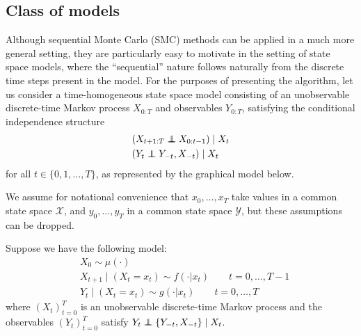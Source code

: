 \documentclass[fleqn]{article}
\newcommand\indep{\protect\mathpalette{\protect\independenT}{\perp}}
\def\independenT#1#2{\mathrel{\rlap{$#1#2$}\mkern2mu{#1#2}}}
\begin{document}
\subsection{Class of models}
Although sequential Monte Carlo (SMC) methods can be applied in a much more general setting, they are particularly easy to motivate in the setting of state space models, where the ``sequential'' nature follows naturally from the discrete time steps present in the model. 
For the purposes of presenting the algorithm, let us consider a time-homogeneous state space model consisting of an unobservable discrete-time Markov process $X_{0:T}$ and observables $Y_{0:T}$, satisfying the conditional independence structure
\begin{align*}
& (X_{t+1:T} \indep X_{0:t-1}) \mid X_t \\
& (Y_t \indep Y_{-t}, X_{-t}) \mid X_t
\end{align*}
for all $t \in \{0,1,\dots, T\}$, as represented by the graphical model below.

\begin{center}
\end{center}

We assume for notational convenience that $x_0,\dots,x_T$ take values in a common state space $\mathcal{X}$, and $y_0,\dots,y_T$ in a common state space $\mathcal{Y}$, but these assumptions can be dropped. 

Suppose we have the following model:
\begin{align*}
& X_0 \sim \mu(\cdot) \\
& X_{t+1} \mid (X_t = x_t) \sim f(\cdot | x_t)  \qquad t=0,\dots,T-1 \\
& Y_t \mid (X_t = x_t) \sim g(\cdot | x_t) \qquad t=0,\dots,T
\end{align*}
where $(X_t)_{t=0}^T$ is an unobservable discrete-time Markov process and the observables $(Y_t)_{t=0}^T$ satisfy $Y_t \indep \{Y_{-t}, X_{-t}\} \mid X_t$. 
\end{document}
